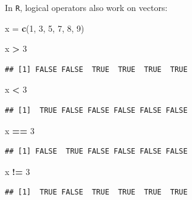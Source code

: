 \documentclass[]{book}
\newenvironment{Shaded}{\begin{snugshade}}{\end{snugshade}}
\newcommand{\KeywordTok}[1]{\textcolor[rgb]{0.13,0.29,0.53}{\textbf{#1}}}
\newcommand{\DecValTok}[1]{\textcolor[rgb]{0.00,0.00,0.81}{#1}}
\newcommand{\StringTok}[1]{\textcolor[rgb]{0.31,0.60,0.02}{#1}}
\newcommand{\OperatorTok}[1]{\textcolor[rgb]{0.81,0.36,0.00}{\textbf{#1}}}
\newcommand{\NormalTok}[1]{#1}
\begin{document}
In \texttt{R}, logical operators also work on vectors:

\begin{Shaded}
\begin{Highlighting}[]
\NormalTok{x =}\StringTok{ }\KeywordTok{c}\NormalTok{(}\DecValTok{1}\NormalTok{, }\DecValTok{3}\NormalTok{, }\DecValTok{5}\NormalTok{, }\DecValTok{7}\NormalTok{, }\DecValTok{8}\NormalTok{, }\DecValTok{9}\NormalTok{)}
\end{Highlighting}
\end{Shaded}

\begin{Shaded}
\begin{Highlighting}[]
\NormalTok{x }\OperatorTok{>}\StringTok{ }\DecValTok{3}
\end{Highlighting}
\end{Shaded}

\begin{verbatim}
## [1] FALSE FALSE  TRUE  TRUE  TRUE  TRUE
\end{verbatim}

\begin{Shaded}
\begin{Highlighting}[]
\NormalTok{x }\OperatorTok{<}\StringTok{ }\DecValTok{3}
\end{Highlighting}
\end{Shaded}

\begin{verbatim}
## [1]  TRUE FALSE FALSE FALSE FALSE FALSE
\end{verbatim}

\begin{Shaded}
\begin{Highlighting}[]
\NormalTok{x }\OperatorTok{==}\StringTok{ }\DecValTok{3}
\end{Highlighting}
\end{Shaded}

\begin{verbatim}
## [1] FALSE  TRUE FALSE FALSE FALSE FALSE
\end{verbatim}

\begin{Shaded}
\begin{Highlighting}[]
\NormalTok{x }\OperatorTok{!=}\StringTok{ }\DecValTok{3}
\end{Highlighting}
\end{Shaded}

\begin{verbatim}
## [1]  TRUE FALSE  TRUE  TRUE  TRUE  TRUE
\end{verbatim}
\end{document}
